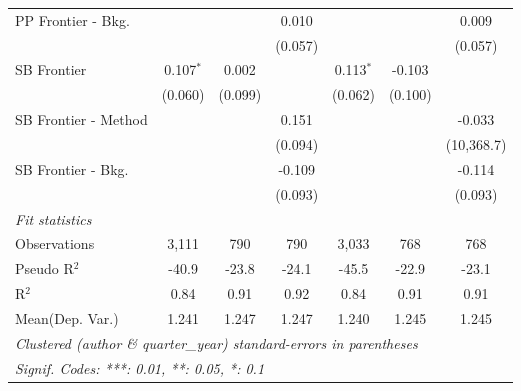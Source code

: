 \begin{tabular}{lcccccc}
   PP Frontier - Bkg.   &              &              & 0.010        &              &              & 0.009\\   
                        &              &              & (0.057)      &              &              & (0.057)\\   
   SB Frontier          & 0.107$^{*}$  & 0.002        &              & 0.113$^{*}$  & -0.103       &   \\   
                        & (0.060)      & (0.099)      &              & (0.062)      & (0.100)      &   \\   
   SB Frontier - Method &              &              & 0.151        &              &              & -0.033\\   
                        &              &              & (0.094)      &              &              & (10,368.7)\\   
   SB Frontier - Bkg.   &              &              & -0.109       &              &              & -0.114\\   
                        &              &              & (0.093)      &              &              & (0.093)\\   
   \midrule
   \emph{Fit statistics}\\
   Observations         & 3,111        & 790          & 790          & 3,033        & 768          & 768\\  
   Pseudo R$^2$         & -40.9        & -23.8        & -24.1        & -45.5        & -22.9        & -23.1\\  
   R$^2$                & 0.84         & 0.91         & 0.92         & 0.84         & 0.91         & 0.91\\  
Mean(Dep. Var.) & 1.241 & 1.247 & 1.247 & 1.240 & 1.245 & 1.245 \\
   \midrule \midrule
   \multicolumn{7}{l}{\emph{Clustered (author \& quarter\_year) standard-errors in parentheses}}\\
   \multicolumn{7}{l}{\emph{Signif. Codes: ***: 0.01, **: 0.05, *: 0.1}}\\
\end{tabular}
\par\endgroup
